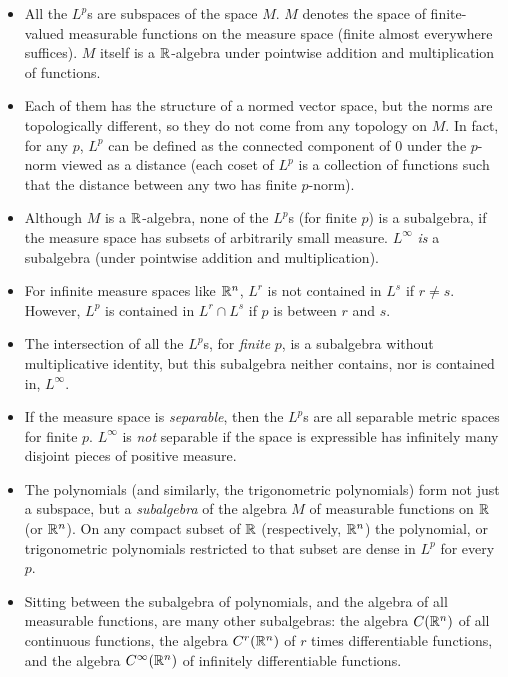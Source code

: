 \documentclass[a4paper]{amsart}
\begin{document}
\begin{itemize}

\item All the $L^p$s are subspaces of the space $M$. $M$ denotes the
  space of finite-valued measurable functions on the measure space
  (finite almost everywhere suffices). $M$ itself is a $\mathbb{R}$-algebra
  under pointwise addition and multiplication of functions.

\item Each of them has the structure of a normed vector space, but the
  norms are topologically different, so they do not come from any
  topology on $M$. In fact, for any $p$, $L^p$ can be defined as the
  connected component of $0$ under the $p$-norm viewed as a distance
  (each coset of $L^p$ is a collection of functions such that the
  distance between any two has finite $p$-norm).

\item Although $M$ is a $\mathbb{R}$-algebra, none of the $L^p$s (for finite
  $p$) is a subalgebra, if the measure space has subsets of
  arbitrarily small measure. $L^\infty$ {\em is} a subalgebra (under
  pointwise addition and multiplication).

\item For infinite measure spaces like $\mathbb{R}^n$, $L^r$ is not contained
  in $L^s$ if $r \ne s$. However, $L^p$ is contained in $L^r \cap L^s$
  if $p$ is between $r$ and $s$.

\item The intersection of all the $L^p$s, for {\em finite} $p$, is a
  subalgebra without multiplicative identity, but this subalgebra
  neither contains, nor is contained in, $L^\infty$.

\item If the measure space is {\em separable}, then the $L^p$s are all
  separable metric spaces for finite $p$. $L^\infty$ is {\em not}
  separable if the space is expressible has infinitely many disjoint
  pieces of positive measure.

\item The polynomials (and similarly, the trigonometric polynomials)
  form not just a subspace, but a {\em subalgebra} of the algebra $M$
  of measurable functions on $\mathbb{R}$ (or $\mathbb{R}^n$). On any compact subset of $\mathbb{R}$
  (respectively, $\mathbb{R}^n$) the polynomial, or trigonometric polynomials
  restricted to that subset are dense in $L^p$ for every $p$.

\item Sitting between the subalgebra of polynomials, and the algebra
  of all measurable functions, are many other subalgebras: the algebra
  $C(\mathbb{R}^n)$ of all continuous functions, the algebra $C^r(\mathbb{R}^n)$ of
  $r$ times differentiable functions, and the algebra $C^\infty(\mathbb{R}^n)$
  of infinitely differentiable functions. 


\end{itemize}
\end{document}
